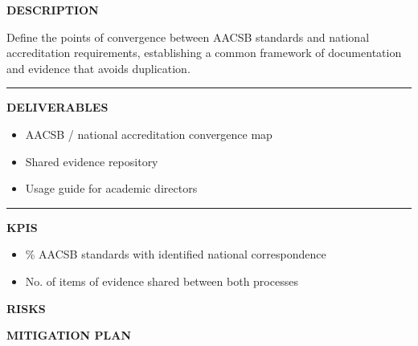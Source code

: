 \documentclass[11pt,a4paper]{scrreprt}
\newcommand{\fieldlabel}[1]{%
  {\footnotesize\sffamily\bfseries\color{mutedcolor}\MakeUppercase{#1}}\par\nopagebreak[4]
}
\newcommand{\fieldsep}{\vspace{3pt}\noindent\textcolor{bordercolor}{\rule{\linewidth}{0.4pt}}\vspace{3pt}\par}
\begin{document}
\begin{tcolorbox}[pabox={gobcolor}{A.P.2.1 \enspace\textbullet\enspace Integration of AACSB and national accreditation processes}]

\fieldlabel{Description}
{\small Define the points of convergence between AACSB standards and national accreditation requirements, establishing a common framework of documentation and evidence that avoids duplication.}\par
\fieldsep
\fieldlabel{Deliverables}
{\small \begin{itemize}[noitemsep,topsep=2pt]
\item AACSB / national accreditation convergence map
\item Shared evidence repository
\item Usage guide for academic directors
\end{itemize}}\par
\fieldsep
\fieldlabel{KPIs}
{\small \begin{itemize}[noitemsep,topsep=2pt]
\item \% AACSB standards with identified national correspondence
\item No. of items of evidence shared between both processes
\end{itemize}}\par
\end{tcolorbox}
\begin{tcolorbox}[riskbox]
{\footnotesize\sffamily\bfseries\color{red!50!black} RISKS}\par{}
\end{tcolorbox}
\begin{tcolorbox}[mitbox]
{\footnotesize\sffamily\bfseries\color{green!40!black} MITIGATION PLAN}\par{}
\end{tcolorbox}
\vspace{8pt}
\end{document}
